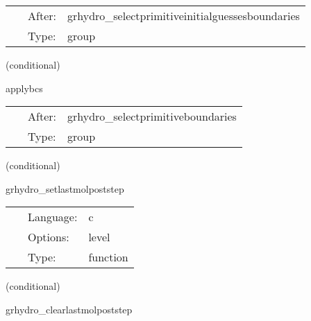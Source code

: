 \hspace{5mm}{\it apply boundary conditions to initial guess primitive variables } 


\hspace{5mm}

 \begin{tabular*}{160mm}{cll} 
~ & After:  & grhydro\_selectprimitiveinitialguessesboundaries \\ 
~ & Type:  & group \\ 
\end{tabular*} 


\vspace{5mm}

   (conditional) 

\hspace{5mm} applybcs 

\hspace{5mm}{\it apply boundary conditions to all primitive variables } 


\hspace{5mm}

 \begin{tabular*}{160mm}{cll} 
~ & After:  & grhydro\_selectprimitiveboundaries \\ 
~ & Type:  & group \\ 
\end{tabular*} 


\vspace{5mm}

   (conditional) 

\hspace{5mm} grhydro\_setlastmolpoststep 

\hspace{5mm}{\it set grid scalar inlastmolpoststep if this is the last mol poststep call } 


\hspace{5mm}

 \begin{tabular*}{160mm}{cll} 
~ & Language:  & c \\ 
~ & Options:  & level \\ 
~ & Type:  & function \\ 
\end{tabular*} 


\vspace{5mm}

   (conditional) 

\hspace{5mm} grhydro\_clearlastmolpoststep 


